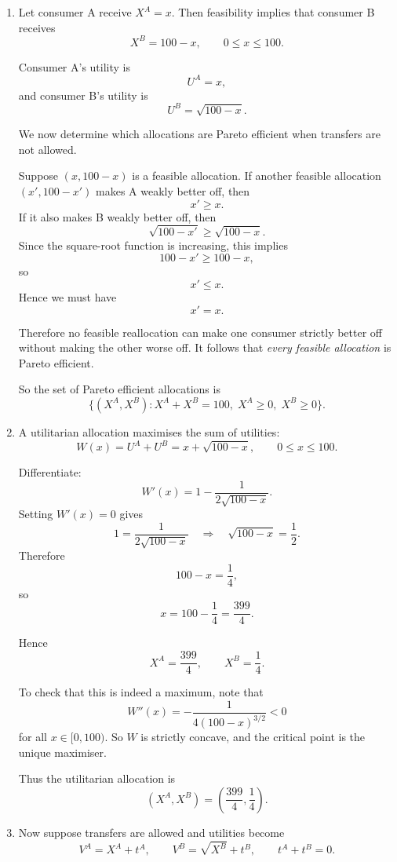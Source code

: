 \documentclass[12pt]{article}
\begin{document}
\begin{enumerate}[label=(\alph*)]
    \item
    Let consumer A receive \(X^A=x\). Then feasibility implies that consumer B receives
    \[
    X^B=100-x,
    \qquad 0\le x\le 100.
    \]

    Consumer A's utility is
    \[
    U^A=x,
    \]
    and consumer B's utility is
    \[
    U^B=\sqrt{100-x}.
    \]

    We now determine which allocations are Pareto efficient when transfers are not allowed.

    Suppose \((x,100-x)\) is a feasible allocation. If another feasible allocation \((x',100-x')\) makes A weakly better off, then
    \[
    x'\ge x.
    \]
    If it also makes B weakly better off, then
    \[
    \sqrt{100-x'}\ge \sqrt{100-x}.
    \]
    Since the square-root function is increasing, this implies
    \[
    100-x'\ge 100-x,
    \]
    so
    \[
    x'\le x.
    \]
    Hence we must have
    \[
    x'=x.
    \]

    Therefore no feasible reallocation can make one consumer strictly better off without making the other worse off. It follows that \emph{every feasible allocation} is Pareto efficient.

    So the set of Pareto efficient allocations is
    \[
    \boxed{\{(X^A,X^B): X^A+X^B=100,\; X^A\ge 0,\; X^B\ge 0\}.}
    \]

    \item
    A utilitarian allocation maximises the sum of utilities:
    \[
    W(x)=U^A+U^B=x+\sqrt{100-x},
    \qquad 0\le x\le 100.
    \]

    Differentiate:
    \[
    W'(x)=1-\frac{1}{2\sqrt{100-x}}.
    \]
    Setting \(W'(x)=0\) gives
    \[
    1=\frac{1}{2\sqrt{100-x}}
    \quad\Longrightarrow\quad
    \sqrt{100-x}=\frac12.
    \]
    Therefore
    \[
    100-x=\frac14,
    \]
    so
    \[
    x=100-\frac14=\frac{399}{4}.
    \]

    Hence
    \[
    X^A=\frac{399}{4},
    \qquad
    X^B=\frac14.
    \]

    To check that this is indeed a maximum, note that
    \[
    W''(x)=-\frac{1}{4(100-x)^{3/2}}<0
    \]
    for all \(x\in[0,100)\). So \(W\) is strictly concave, and the critical point is the unique maximiser.

    Thus the utilitarian allocation is
    \[
    \boxed{\left(X^A,X^B\right)=\left(\frac{399}{4},\frac14\right).}
    \]

    \item
    Now suppose transfers are allowed and utilities become
    \[
    V^A=X^A+t^A,
    \qquad
    V^B=\sqrt{X^B}+t^B,
    \qquad
    t^A+t^B=0.
    \]


\end{enumerate}
\end{document}
